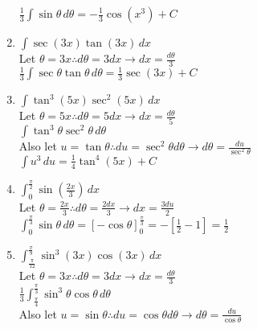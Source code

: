 \documentclass[10pt, letterpaper]{report}
\begin{document}
\begin{enumerate}
    $\frac{1}{3}\int{\sin{\theta}\,d\theta=
    -\frac{1}{3}\cos{(x^{3})}}+C$ \\

  \item{$\int{\sec{(3x)}\tan{(3x)}}\,dx$} \\

    Let $\theta=3x\therefore d\theta=3dx\rightarrow dx=\frac{d\theta}{3}$ \\

    $\frac{1}{3}\int{\sec{\theta}\tan{\theta}}\,d\theta=
    \frac{1}{3}\sec{(3x)}+C$ \\

  \item{$\int{\tan^{3}{(5x)}\sec^{2}{(5x)}}\,dx$} \\

    Let $\theta=5x\therefore d\theta=5dx\rightarrow dx=\frac{d\theta}{5}$ \\

    $\int{\tan^{3}{\theta}\sec^{2}{\theta}}\,d\theta$ \\

    Also let $u=\tan{\theta}\therefore du=\sec^{2}{\theta}d\theta\rightarrow d\theta=\frac{du}{\sec^{2}{\theta}}$ \\

    $\int{u^{3}}\,du=
    \frac{1}{4}\tan^{4}{(5x)}+C$ \\

  \item{$\int_{0}^{\frac{\pi}{2}}{\sin{(\frac{2x}{3})}}\,dx$} \\

    Let $\theta=\frac{2x}{3}\therefore d\theta=\frac{2dx}{3}\rightarrow dx=\frac{3du}{2}$ \\

    $\int_{0}^{\frac{\pi}{3}}{\sin{\theta}}\,d\theta=
    [-\cos{\theta}]_{0}^{\frac{\pi}{3}}=
    -[\frac{1}{2}-1]=\frac{1}{2}$ \\

  \item{$\int_{\frac{\pi}{12}}^{\frac{\pi}{9}}{\sin^{3}{(3x)}\cos{(3x)}}\,dx$} \\

    Let $\theta=3x\therefore d\theta=3dx\rightarrow dx=\frac{d\theta}{3}$ \\

    $\frac{1}{3}\int_{\frac{\pi}{4}}^{\frac{\pi}{3}}{\sin^{3}{\theta}\cos{\theta}}\,d\theta$ \\

    Also let $u=\sin{\theta}\therefore du=\cos{\theta}d\theta\rightarrow d\theta=\frac{du}{\cos{\theta}}$ \\


\end{enumerate}
\end{document}
